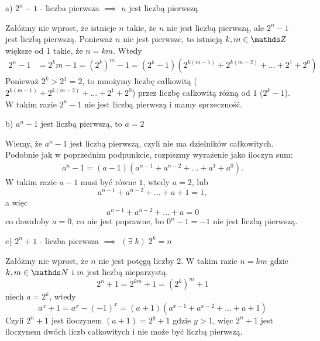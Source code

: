 \documentclass{article}[13pt]
\begin{document}
{\color{def}a) $2^n-1$ - liczba pierwsza $\implies$ $n$ jest liczbą pierwszą}
\smallskip

Załóżmy nie wprost, że istnieje $n$ takie, że $n$ nie jest liczbą pierwszą, ale $2^n-1$ jest liczbą pierwszą. Ponieważ $n$ nie jest pierwsze, to istnieją $k,m\in\Z$ większe od 1 takie, że $n=km$. Wtedy
\begin{align*}
    2^n-1&=2^km-1=(2^k)^m-1=(2^k-1)(2^{k(m-1)}+2^{k(m-2)}+...+2^1+2^0)
\end{align*}
Ponieważ $2^k>2^1=2$, to mnożymy liczbę całkowitą ($2^{k(m-1)}+2^{k(m-2)}+...+2^1+2^0$) przez liczbę całkowitą różną od $1$ ($2^k-1$). W takim razie $2^n-1$ nie jest liczbą pierwszą i mamy sprzeczność.
\medskip

{\color{def}b) $a^n-1$ jest liczbą pierwszą, to $a=2$}
\smallskip

Wiemy, że $a^n-1$ jest liczbą pierwszą, czyli nie ma dzielników całkowitych. Podobnie jak w poprzednim podpunkcie, rozpiszmy wyrażenie jako iloczyn sum:
\begin{align*}
    a^n-1=(a-1)(a^{n-1}+a^{n-2}+...+a^1+a^0).
\end{align*}
W takim razie $a-1$ musi być równe $1$, wtedy $a=2$, lub
$$a^{n-1}+a^{n-2}+...+a+1=1,$$
a więc
$$a^{n-1}+a^{n-2}+...+a=0$$
co dawałoby $a=0$, co nie jest poprawne, bo $0^n-1=-1$ nie jest liczbą pierwszą.
\medskip

{\color{def}c) $2^n+1$ - liczba pierwsza $\implies$ $(\exists\;k)\;2^k=n$}
\medskip

Załóżmy nie wprost, że $n$ nie jest potęgą liczby $2$. W takim razie $n=km$ gdzie $k,m\in\N$ i $m$ jest liczbą nieparzystą.
$$2^n+1=2^{km}+1=(2^k)^m+1$$
niech $a=2^k$, wtedy
$$a^x+1=a^x-(-1)^x=(a+1)(a^{x-1}+a^{x-2}+...+a+1)$$
Czyli $2^n+1$ jest iloczynem $(a+1)=2^y+1$ gdzie $y>1$, więc $2^n+1$ jest iloczynem dwóch liczb całkowitych i nie może być liczbą pierwszą.
\end{document}
